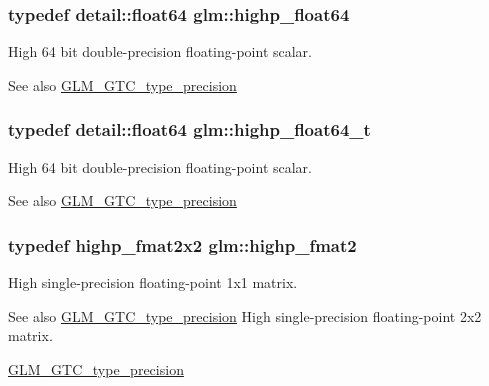 \subsubsection[{\texorpdfstring{highp\+\_\+float64}{highp_float64}}]{\setlength{\rightskip}{0pt plus 5cm}typedef detail\+::float64 {\bf glm\+::highp\+\_\+float64}}\hypertarget{group__gtc__type__precision_gab871a78c548d2fa53e1e8ec64a46eee7}{}\label{group__gtc__type__precision_gab871a78c548d2fa53e1e8ec64a46eee7}
High 64 bit double-\/precision floating-\/point scalar. \begin{DoxySeeAlso}{See also}
\hyperlink{group__gtc__type__precision}{G\+L\+M\+\_\+\+G\+T\+C\+\_\+type\+\_\+precision} 
\end{DoxySeeAlso}
\subsubsection[{\texorpdfstring{highp\+\_\+float64\+\_\+t}{highp_float64_t}}]{\setlength{\rightskip}{0pt plus 5cm}typedef detail\+::float64 {\bf glm\+::highp\+\_\+float64\+\_\+t}}\hypertarget{group__gtc__type__precision_gae8b3b2ace5be2a61c6bf63f12643fa15}{}\label{group__gtc__type__precision_gae8b3b2ace5be2a61c6bf63f12643fa15}
High 64 bit double-\/precision floating-\/point scalar. \begin{DoxySeeAlso}{See also}
\hyperlink{group__gtc__type__precision}{G\+L\+M\+\_\+\+G\+T\+C\+\_\+type\+\_\+precision} 
\end{DoxySeeAlso}
\subsubsection[{\texorpdfstring{highp\+\_\+fmat2}{highp_fmat2}}]{\setlength{\rightskip}{0pt plus 5cm}typedef highp\+\_\+fmat2x2 {\bf glm\+::highp\+\_\+fmat2}}\hypertarget{group__gtc__type__precision_ga10d47be18a81c111a8706d0a6df5b4ea}{}\label{group__gtc__type__precision_ga10d47be18a81c111a8706d0a6df5b4ea}
High single-\/precision floating-\/point 1x1 matrix. \begin{DoxySeeAlso}{See also}
\hyperlink{group__gtc__type__precision}{G\+L\+M\+\_\+\+G\+T\+C\+\_\+type\+\_\+precision} High single-\/precision floating-\/point 2x2 matrix. 

\hyperlink{group__gtc__type__precision}{G\+L\+M\+\_\+\+G\+T\+C\+\_\+type\+\_\+precision} 
\end{DoxySeeAlso}
